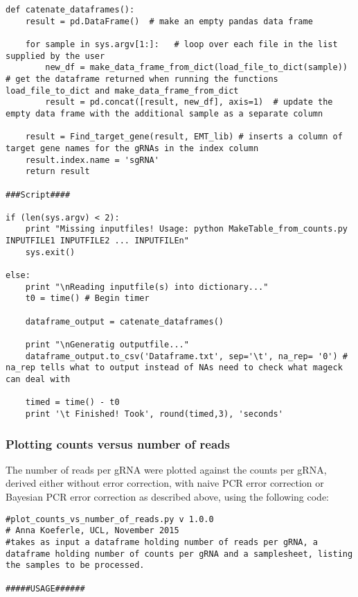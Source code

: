 \begin{footnotesize}
\begin{lstlisting}
def catenate_dataframes():
    result = pd.DataFrame()  # make an empty pandas data frame

    for sample in sys.argv[1:]:   # loop over each file in the list supplied by the user
        new_df = make_data_frame_from_dict(load_file_to_dict(sample))  # get the dataframe returned when running the functions load_file_to_dict and make_data_frame_from_dict
        result = pd.concat([result, new_df], axis=1)  # update the empty data frame with the additional sample as a separate column

    result = Find_target_gene(result, EMT_lib) # inserts a column of target gene names for the gRNAs in the index column
    result.index.name = 'sgRNA'
    return result

###Script####

if (len(sys.argv) < 2):
    print "Missing inputfiles! Usage: python MakeTable_from_counts.py INPUTFILE1 INPUTFILE2 ... INPUTFILEn"
    sys.exit()

else:
    print "\nReading inputfile(s) into dictionary..."
    t0 = time() # Begin timer

    dataframe_output = catenate_dataframes()

    print "\nGeneratig outputfile..."
    dataframe_output.to_csv('Dataframe.txt', sep='\t', na_rep= '0') # na_rep tells what to output instead of NAs need to check what mageck can deal with

    timed = time() - t0
    print '\t Finished! Took', round(timed,3), 'seconds'

\end{lstlisting}

\subsubsection{Plotting counts versus number of reads}

The number of reads per gRNA were plotted against the counts per gRNA, derived either without error correction, with naive PCR error correction or Bayesian PCR error correction as described above, using the following code:

\begin{lstlisting}
#plot_counts_vs_number_of_reads.py v 1.0.0
# Anna Koeferle, UCL, November 2015
#takes as input a dataframe holding number of reads per gRNA, a dataframe holding number of counts per gRNA and a samplesheet, listing the samples to be processed.

#####USAGE######


\end{lstlisting}
\end{footnotesize}
